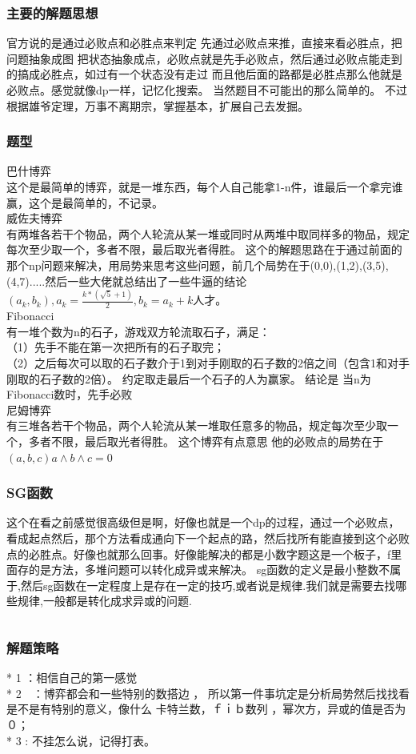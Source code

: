 \documentclass[a4paper,13.6pt]{article}
\begin{document}
\begin{CJK}{UTF8}{gbsn}
\subsubsection{主要的解题思想}
官方说的是通过必败点和必胜点来判定
先通过必败点来推，直接来看必胜点，把问题抽象成图 把状态抽象成点，必败点就是先手必败点，然后通过必败点能走到的搞成必胜点，如过有一个状态没有走过 而且他后面的路都是必胜点那么他就是必败点。感觉就像dp一样，记忆化搜索。
当然题目不可能出的那么简单的。
不过根据雄爷定理，万事不离期宗，掌握基本，扩展自己去发掘。
\subsubsection{题型}
巴什博弈\\
这个是最简单的博弈，就是一堆东西，每个人自己能拿1-n件，谁最后一个拿完谁赢，这个是最简单的，不记录。
\\威佐夫博弈\\
有两堆各若干个物品，两个人轮流从某一堆或同时从两堆中取同样多的物品，规定每次至少取一个，多者不限，最后取光者得胜。
这个的解题思路在于通过前面的那个np问题来解决，用局势来思考这些问题，前几个局势在于(0,0),(1,2),(3,5),(4,7).....然后一些大佬就总结出了一些牛逼的结论$( a_k,b_k),a_k=\frac{k*(\sqrt{5}+1)}{2} , b_k=a_k+k$人才。
\\Fibonacci\\
有一堆个数为n的石子，游戏双方轮流取石子，满足：
\\（1）先手不能在第一次把所有的石子取完；
\\（2）之后每次可以取的石子数介于1到对手刚取的石子数的2倍之间（包含1和对手刚取的石子数的2倍）。 约定取走最后一个石子的人为赢家。
结论是 当n为Fibonacci数时，先手必败
\\尼姆博弈\\
有三堆各若干个物品，两个人轮流从某一堆取任意多的物品，规定每次至少取一个，多者不限，最后取光者得胜。
这个博弈有点意思 他的必败点的局势在于$(a,b,c) a \land {b \land c} = 0$
\subsubsection{SG函数}
这个在看之前感觉很高级但是啊，好像也就是一个dp的过程，通过一个必败点，看成起点然后，那个方法看成通向下一个起点的路，然后找所有能直接到这个必败点的必胜点。好像也就那么回事。好像能解决的都是小数字题这是一个板子，f里面存的是方法，多堆问题可以转化成异或来解决。
sg函数的定义是最小整数不属于,然后sg函数在一定程度上是存在一定的技巧,或者说是规律.我们就是需要去找哪些规律,一般都是转化成求异或的问题.
\inputminted{c++}{../scoure/math/boyi.cpp}
\subsubsection{解题策略}
* 1  ：相信自己的第一感觉\\
* 2　：博弈都会和一些特别的数搭边 ， 所以第一件事坑定是分析局势然后找找看是不是有特别的意义，像什么 卡特兰数，ｆｉｂ数列 ，幂次方，异或的值是否为０；\\
* 3  : 不挂怎么说，记得打表。\\

\end{CJK}
\end{document}
